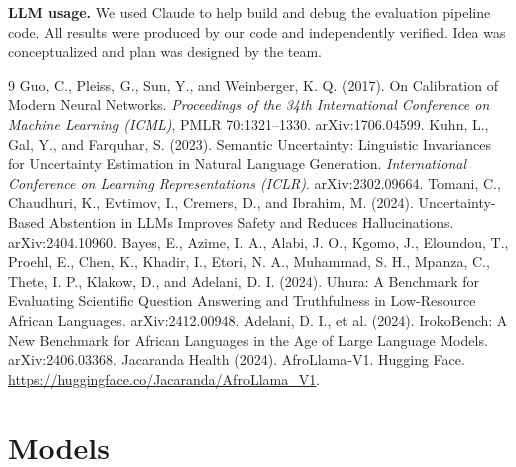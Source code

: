 \documentclass[11pt]{article}
\begin{document}
\noindent\textbf{LLM usage.} We used Claude to help build and debug the evaluation pipeline code. All results were produced by our code and independently verified. Idea was conceptualized and plan was designed by the team.

\begin{thebibliography}{9}\small
{} Guo, C., Pleiss, G., Sun, Y., and Weinberger, K. Q. (2017). On Calibration of
Modern Neural Networks. \textit{Proceedings of the 34th International Conference on Machine Learning
(ICML)}, PMLR 70:1321--1330. arXiv:1706.04599.
 Kuhn, L., Gal, Y., and Farquhar, S. (2023). Semantic Uncertainty: Linguistic
Invariances for Uncertainty Estimation in Natural Language Generation. \textit{International
Conference on Learning Representations (ICLR)}. arXiv:2302.09664.
 Tomani, C., Chaudhuri, K., Evtimov, I., Cremers, D., and Ibrahim, M. (2024).
Uncertainty-Based Abstention in LLMs Improves Safety and Reduces Hallucinations. arXiv:2404.10960.
 Bayes, E., Azime, I. A., Alabi, J. O., Kgomo, J., Eloundou, T., Proehl, E., Chen, K.,
Khadir, I., Etori, N. A., Muhammad, S. H., Mpanza, C., Thete, I. P., Klakow, D., and Adelani, D. I.
(2024). Uhura: A Benchmark for Evaluating Scientific Question Answering and Truthfulness in
Low-Resource African Languages. arXiv:2412.00948.
 Adelani, D. I., et al. (2024). IrokoBench: A New Benchmark for African Languages
in the Age of Large Language Models. arXiv:2406.03368.
 Jacaranda Health (2024). AfroLlama-V1. Hugging Face.
\url{https://huggingface.co/Jacaranda/AfroLlama_V1}.
\end{thebibliography}

\appendix
\vspace{2.5em}
\par
\vspace{0.6em}

\section{Models}\label{app:models}
\begin{table}[h]\centering\small
\caption{Open-weight models evaluated.}
\label{tab:models}
\end{table}
\end{document}
